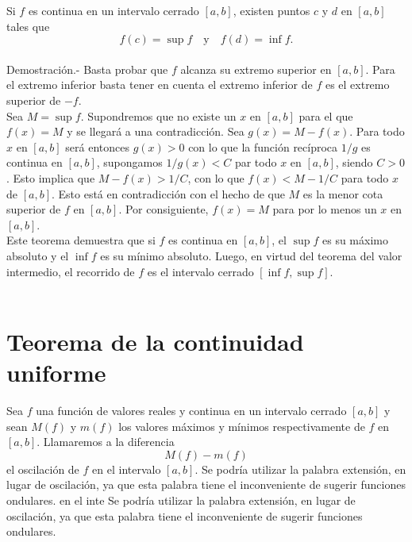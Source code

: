 \begin{teo}
    Si $f$ es continua en un intervalo cerrado $[a,b]$, existen puntos $c$ y $d$ en $[a,b]$ tales que
    $$f(c)=\sup f\quad \mbox{y}\quad f(d)=\inf f.$$\\
	Demostración.-\; Basta probar que $f$ alcanza su extremo superior en $[a,b]$. Para el extremo inferior basta tener en cuenta el extremo inferior de $f$ es el extremo superior de $-f$.\\
	Sea $M=\sup f$. Supondremos que no existe un $x$ en $[a,b]$ para el que $f(x)=M$ y se llegará a una contradicción. Sea $g(x)=M-f(x)$. Para todo $x$ en $[a,b]$ será entonces $g(x)>0$ con lo que la función recíproca $1/g$ es continua en $[a,b]$, supongamos $1/g(x)<C$ par todo $x$ en $[a,b]$, siendo $C>0$. Esto implica que $M-f(x)>1/C$, con lo que $f(x)<M-1/C$ para todo $x$ de $[a,b]$. Esto está en contradicción con el hecho de que $M$ es la menor cota superior de $f$ en $[a,b]$. Por consiguiente, $f(x)=M$ para por lo menos un $x$ en $[a,b]$.\\
	Este teorema demuestra que si $f$ es continua en $[a,b]$, el $\sup f$ es su máximo absoluto y el $\inf f$ es su mínimo absoluto. Luego, en virtud del teorema del valor intermedio, el recorrido de $f$ es el intervalo cerrado $[\inf f, \sup f]$.\\\\
\end{teo}

\section{Teorema de la continuidad uniforme}

\begin{tcolorbox}
    \begin{def.}
	Sea $f$ una función de valores reales y continua en un intervalo cerrado $[a,b]$ y sean $M(f)$ y $m(f)$ los valores máximos y mínimos respectivamente de $f$ en $[a,b]$. Llamaremos a la diferencia 
	$$M(f)-m(f)$$
	el oscilación de $f$ en el intervalo $[a,b]$. Se podría utilizar la palabra extensión, en lugar de oscilación, ya que esta palabra tiene el inconveniente de sugerir funciones ondulares. en el inte Se podría utilizar la palabra extensión, en lugar de oscilación, ya que esta palabra tiene el inconveniente de sugerir funciones ondulares.
    \end{def.}
\end{tcolorbox}

